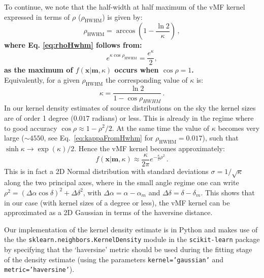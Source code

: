\documentclass[twocolumn]{aa}
\begin{document}
\begin{appendix}
To continue, we note that the half-width at half maximum of the vMF kernel expressed in terms of
$\rho$ ($\rho_\mathrm{HWHM}$) is given by:
\begin{equation}
  \rho_\mathrm{HWHM} = \arccos\left(1-\frac{\ln 2}{\kappa}\right)\,,
  \label{eq:rhoHwhm}
\end{equation}
\textbf{where Eq. \ref{eq:rhoHwhm} follows from:}
\begin{equation}
e^{\kappa\cos\rho_{\mathrm{HWHM}}} = \frac{e^{\kappa}}{2}, 
\end{equation}
\textbf{as the maximum of $f(\mathbf{x}|\mathbf{m}, \kappa)$ occurs when $\cos\rho = 1$.}\\
\noindent
Equivalently, for a given $\rho_\mathrm{HWHM}$ the corresponding value of $\kappa$ is:
\begin{equation}
  \kappa = \frac{\ln 2}{1-\cos\rho_{HWHM}}\,.
  \label{eq:kappaFromHwhm}
\end{equation}
In our kernel density estimates of source distributions on the sky the kernel sizes are of order 1
degree ($0.017$ radians) or less. This is already in the regime where  to good accuracy
$\cos\rho\approx 1-\rho^2/2$. At the same time the value of $\kappa$ becomes very large ($\sim4550$,
see Eq.\ \ref{eq:kappaFromHwhm} for $\rho_\mathrm{HWHM}=0.017$), such that $\sinh\kappa
\rightarrow \exp(\kappa)/2$. Hence the vMF kernel becomes approximately:
\begin{equation}
  f(\mathbf{x}|\mathbf{m},\kappa) \approx \frac{\kappa}{2\pi}e^{-\frac{\kappa}{2}\rho^2}\,.
\end{equation}
This is in fact a 2D Normal distribution with standard deviations $\sigma=1/\sqrt{\kappa}$ along the
two principal axes, where in the small angle regime one can write $\rho^2 =
(\Delta\alpha\cos\delta)^2 + \Delta\delta^2$, with $\Delta\alpha=\alpha-\alpha_m$ and
$\Delta\delta=\delta-\delta_m$. This shows that in our case (with kernel sizes of a degree or less),
the vMF kernel can be approximated as a 2D Gaussian in terms of the haversine distance.

Our implementation of the kernel density estimate is in Python and makes use of the the
\texttt{sklearn.neighbors.KernelDensity} module in the \texttt{scikit-learn} package by specifying
that the `haversine' metric should be used during the fitting stage of the density estimate (using
the parameters \texttt{kernel='gaussian'} and \texttt{metric='haversine'}).

\end{appendix}
\end{document}
